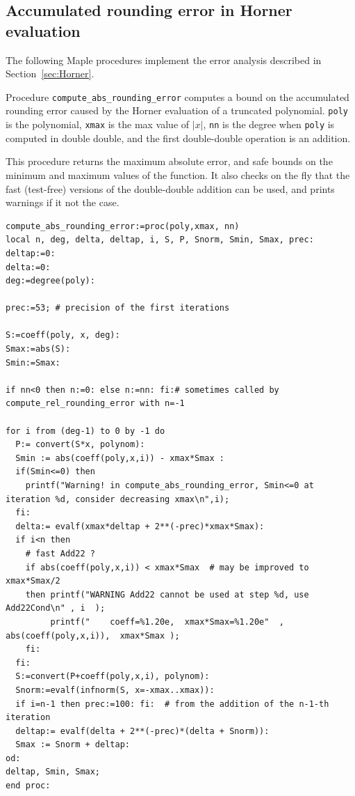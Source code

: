 \subsection{Accumulated rounding error in Horner evaluation
 \label{sec:Horner-maple}}



The following Maple procedures implement the error analysis described
in Section~\ref{sec:Horner}.

Procedure \texttt{compute\_abs\_rounding\_error} computes a bound on
the accumulated rounding error caused by the Horner evaluation of a
truncated polynomial. \texttt{poly} is the polynomial, \texttt{xmax} is the max value of
$|x|$, \texttt{nn} is the degree when \texttt{poly} is computed in double double, and the
first double-double operation is an addition.

This procedure returns the maximum absolute error, and safe bounds on the
minimum and maximum values of the function. It also checks on the fly
that the fast (test-free) versions of the double-double addition can
be used, and prints warnings if it not the case.

\begin{lstlisting}[caption={compute\_abs\_rounding\_error},firstnumber=1]
compute_abs_rounding_error:=proc(poly,xmax, nn)
local n, deg, delta, deltap, i, S, P, Snorm, Smin, Smax, prec:
deltap:=0:
delta:=0:
deg:=degree(poly):

prec:=53; # precision of the first iterations

S:=coeff(poly, x, deg):
Smax:=abs(S):
Smin:=Smax:

if nn<0 then n:=0: else n:=nn: fi:# sometimes called by compute_rel_rounding_error with n=-1

for i from (deg-1) to 0 by -1 do
  P:= convert(S*x, polynom):
  Smin := abs(coeff(poly,x,i)) - xmax*Smax : 
  if(Smin<=0) then 
    printf("Warning! in compute_abs_rounding_error, Smin<=0 at iteration %d, consider decreasing xmax\n",i);
  fi:
  delta:= evalf(xmax*deltap + 2**(-prec)*xmax*Smax):
  if i<n then 
    # fast Add22 ?    
    if abs(coeff(poly,x,i)) < xmax*Smax  # may be improved to xmax*Smax/2
    then printf("WARNING Add22 cannot be used at step %d, use Add22Cond\n" , i  );   
         printf("    coeff=%1.20e,  xmax*Smax=%1.20e"  ,  abs(coeff(poly,x,i)),  xmax*Smax );
    fi:
  fi:
  S:=convert(P+coeff(poly,x,i), polynom):
  Snorm:=evalf(infnorm(S, x=-xmax..xmax)):
  if i=n-1 then prec:=100: fi:  # from the addition of the n-1-th iteration
  deltap:= evalf(delta + 2**(-prec)*(delta + Snorm)): 
  Smax := Snorm + deltap:  
od:
deltap, Smin, Smax;
end proc:
\end{lstlisting}
\vspace{0.5cm}

